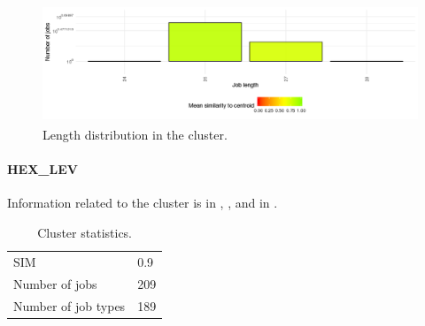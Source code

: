 \documentclass[]{llncs}
\begin{document}
\begin{figure}
  \centering
  \includegraphics[width=4.61in,height=1.39in]{./media/image6.png}
  \caption{Length distribution in the cluster.}
  \label{fig:use_case:bin_aggzeros:length}
\end{figure}


\paragraph{HEX\_LEV}
Information related to the cluster is in , , and in .

\begin{table}
  \centering
  \begin{tabular}{ll}
    SIM & 0.9 \\
    Number of jobs & 209 \\
    Number of job types & 189 \\
  \end{tabular}
  \caption{Cluster statistics.}
  \label{tab:use_case:hex_lev:stats}
\end{table}
\end{document}
